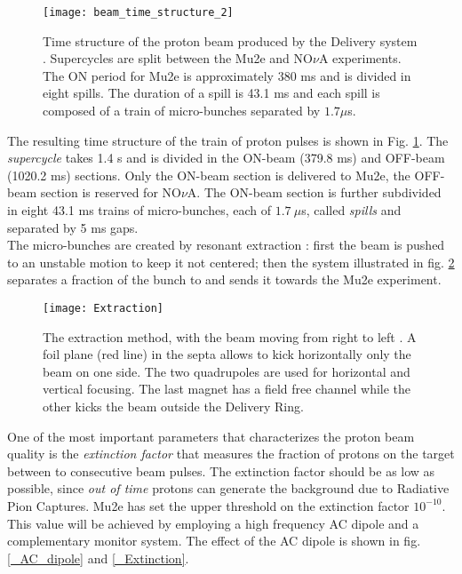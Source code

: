 \documentclass[12pt,a4paper,openright, oneside, titlepage]{book} %
\begin{document}
\begin{figure}[h!]
\centering
\texttt{[image: beam\_time\_structure\_2]}
\caption{Time structure of the proton beam produced by the Delivery system \cite{BeamStruct}. 
Supercycles are split between the Mu2e and NO$\nu$A experiments. 
The ON period for Mu2e is approximately 380 ms and is divided in eight spills. 
The duration of a spill is 43.1 ms and each spill is composed of a train of micro-bunches 
separated by $1.7 \mu$s.}
\label{_beam_time_structure}
\end{figure}

\noindent
The resulting time structure of the train of proton pulses is shown in Fig. \ref{_beam_time_structure}.
The \textit{supercycle} takes 1.4 s and is divided in the ON-beam (379.8 ms) and OFF-beam (1020.2 ms) sections. 
Only the ON-beam section is delivered to Mu2e, the OFF-beam section is reserved for NO$\nu$A.
The ON-beam section is further subdivided in eight 43.1 ms trains of micro-bunches, each of $1.7\ \mu$s, 
called \textit{spills} and  separated by 5 ms gaps.\\
The micro-bunches are created by resonant extraction \cite{Extraction}: first the beam is pushed to an unstable motion to keep it not centered; then the system illustrated in fig. \ref{_Extraction} separates a fraction of the bunch to and sends it towards the Mu2e experiment. 

\begin{figure}[h!]
\centering
\texttt{[image: Extraction]}
\caption{The extraction method, with the beam moving from right to left \cite{Extraction}. A foil plane (red line) in the septa allows to kick horizontally only the beam on one side. The two quadrupoles are used for horizontal and vertical focusing. The last magnet has a field free channel while the other kicks the beam outside the Delivery Ring.}
\label{_Extraction}
\end{figure}

\noindent 
One of the most important parameters that characterizes the proton beam quality is the 
\textit{extinction factor} that measures the fraction of protons on the
target between to consecutive beam pulses. The extinction factor should be 
as low as possible, since \textit{out of time} protons can generate the background due to Radiative Pion Captures. 
Mu2e has set the upper threshold on the extinction factor $10^{-10}$. 
This value will be achieved by employing a high frequency AC dipole and a complementary monitor system. The effect of the AC dipole is shown in fig. \ref{_AC_dipole} and \ref{_Extinction}.\\
\end{document}
